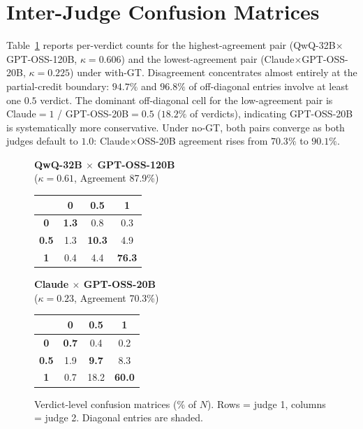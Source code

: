 \section{Inter-Judge Confusion Matrices}
\label{app:confusion}

Table~\ref{tab:confusion-full} reports per-verdict counts for the highest-agreement pair (QwQ-32B$\times$GPT-OSS-120B, $\kappa=0.606$) and the lowest-agreement pair (Claude$\times$GPT-OSS-20B, $\kappa=0.225$) under with-GT. Disagreement concentrates almost entirely at the partial-credit boundary: $94.7\%$ and $96.8\%$ of off-diagonal entries involve at least one $0.5$ verdict. The dominant off-diagonal cell for the low-agreement pair is Claude$=1$ / GPT-OSS-20B$=0.5$ ($18.2\%$ of verdicts), indicating GPT-OSS-20B is systematically more conservative. Under no-GT, both pairs converge as both judges default to $1.0$: Claude$\times$OSS-20B agreement rises from $70.3\%$ to $90.1\%$.

\begin{figure}[!htbp]
\centering
\small
\setlength{\tabcolsep}{4pt}
\renewcommand{\arraystretch}{1.1}

\caption{Verdict-level confusion matrices (\% of $N$). Rows = judge 1, columns = judge 2. Diagonal entries are shaded.}
\label{tab:confusion-full}

\begin{minipage}[t]{0.45\linewidth}
\centering
\textbf{QwQ-32B $\times$ GPT-OSS-120B}\\
{\scriptsize ($\kappa=0.61$, Agreement 87.9\%)}

\vspace{4pt}

\begin{tabular}{c|ccc}
\toprule
 & \textbf{0} & \textbf{0.5} & \textbf{1} \\
\midrule
\textbf{0}   & \cellcolor{gray!15}\textbf{1.3} & 0.8 & 0.3 \\
\textbf{0.5} & 1.3 & \cellcolor{gray!15}\textbf{10.3} & 4.9 \\
\textbf{1}   & 0.4 & 4.4 & \cellcolor{gray!15}\textbf{76.3} \\
\bottomrule
\end{tabular}
\end{minipage}
\hfill
\begin{minipage}[t]{0.45\linewidth}
\centering
\textbf{Claude $\times$ GPT-OSS-20B}\\
{\scriptsize ($\kappa=0.23$, Agreement 70.3\%)}

\vspace{4pt}

\begin{tabular}{c|ccc}
\toprule
 & \textbf{0} & \textbf{0.5} & \textbf{1} \\
\midrule
\textbf{0}   & \cellcolor{gray!15}\textbf{0.7} & 0.4 & 0.2 \\
\textbf{0.5} & 1.9 & \cellcolor{gray!15}\textbf{9.7} & 8.3 \\
\textbf{1}   & 0.7 & 18.2 & \cellcolor{gray!15}\textbf{60.0} \\
\bottomrule
\end{tabular}
\end{minipage}

\end{figure}

